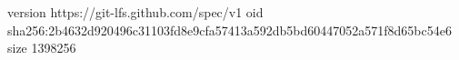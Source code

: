 version https://git-lfs.github.com/spec/v1
oid sha256:2b4632d920496c31103fd8e9cfa57413a592db5bd60447052a571f8d65bc54e6
size 1398256
